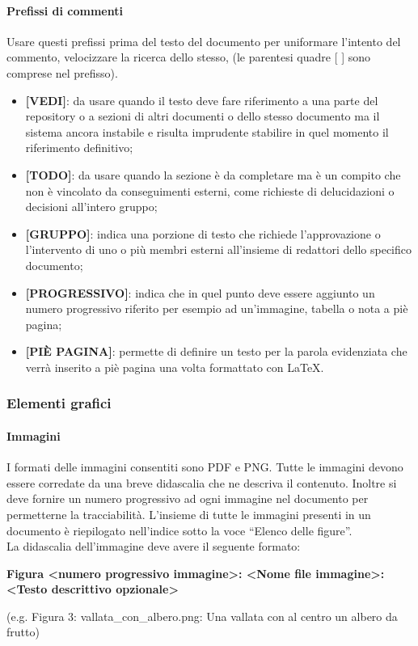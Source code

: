             \paragraph{Prefissi di commenti}
                Usare questi prefissi prima del testo del documento per uniformare l’intento del commento, velocizzare la ricerca dello stesso, (le parentesi quadre {[ ]} sono comprese nel prefisso).\\
                \begin{itemize}
                    \item\textbf{[VEDI]}: da usare quando il testo deve fare riferimento a una parte del repository o a sezioni di altri documenti o dello stesso documento ma il sistema ancora instabile e risulta imprudente stabilire in quel momento il riferimento definitivo; \\
                    \item\textbf{[TODO]}: da usare quando la sezione è da completare ma è un compito che non è vincolato da conseguimenti esterni, come richieste di delucidazioni o decisioni all’intero gruppo; \\
                    \item\textbf{[GRUPPO]}: indica una porzione di testo che richiede l’approvazione o l’intervento di uno o più membri esterni all’insieme di redattori dello specifico documento;\\
                    \item\textbf{[PROGRESSIVO]}: indica che in quel punto deve essere aggiunto un numero progressivo riferito per esempio ad un’immagine, tabella o nota a piè pagina; \\
                    \item\textbf{[PIÈ PAGINA]}: permette di definire un testo per la parola evidenziata che verrà inserito a piè pagina una volta formattato con LaTeX.
                \end{itemize}

        \subsubsection{Elementi grafici}
            \paragraph{Immagini}
                I formati delle immagini consentiti sono PDF e PNG. Tutte le immagini devono essere corredate da una breve didascalia che ne descriva il contenuto. Inoltre si deve fornire un numero progressivo ad ogni immagine nel documento per permetterne la tracciabilità. L’insieme di tutte le immagini presenti in un documento è riepilogato nell'indice sotto la voce “Elenco delle figure”. \\
                La didascalia dell’immagine deve avere il seguente formato:
                \begin{center}
                    \textbf{Figura <numero progressivo immagine>: <Nome file immagine>: <Testo descrittivo opzionale>}
                \end{center}
                (e.g.  Figura 3: vallata\_con\_albero.png: Una vallata con al centro un albero da frutto)
